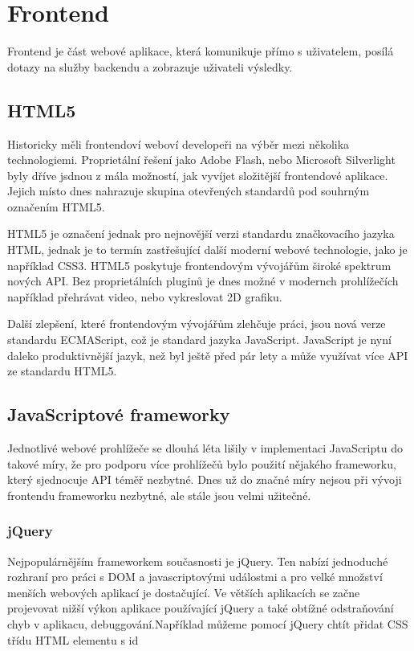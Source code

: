 \chapter{Frontend}
\label{chap:frontend}

Frontend je část webové aplikace, která komunikuje přímo s uživatelem, posílá dotazy na služby backendu a zobrazuje uživateli výsledky.

\section{HTML5}

Historicky měli frontendoví weboví developeři na výběr mezi několika technologiemi. Proprietální řešení jako Adobe Flash, nebo Microsoft Silverlight byly dříve jsdnou z mála možností, jak vyvíjet složitější frontendové aplikace. Jejich místo dnes nahrazuje skupina otevřených standardů pod souhrným označením HTML5.

HTML5 je označení jednak pro nejnovější verzi standardu značkovacího jazyka HTML, jednak je to termín zastřešující další moderní webové technologie, jako je například CSS3. HTML5 poskytuje frontendovým vývojářům široké spektrum nových API. Bez proprietálních pluginů je dnes možné v modernch prohlížečích například přehrávat video, nebo vykreslovat 2D grafiku.

Další zlepšení, které frontendovým vývojářům zlehčuje práci, jsou nová verze standardu ECMAScript, což je standard jazyka JavaScript. JavaScript je nyní daleko produktivnější jazyk, než byl ještě před pár lety a může využívat více API ze standardu HTML5.

\section{JavaScriptové frameworky}

Jednotlivé webové prohlížeče se dlouhá léta lišily v implementaci JavaScriptu do takové míry, že pro podporu více prohlížečů bylo použití nějakého frameworku, který sjednocuje API téměř nezbytné. Dnes už do značné míry nejsou při vývoji frontendu frameworku nezbytné, ale stále jsou velmi užitečné.

\subsection{jQuery}
Nejpopulárnějším frameworkem současnosti je jQuery. Ten nabízí jednoduché rozhraní pro práci s DOM a javascriptovými událostmi a pro velké množství menších webových aplikací je dostačující. Ve větších aplikacích se začne projevovat nižší výkon aplikace používající jQuery a také obtížné odstraňování chyb v aplikacu, debuggování.Například můžeme pomocí jQuery chtít přidat CSS třídu  HTML elementu s id 

